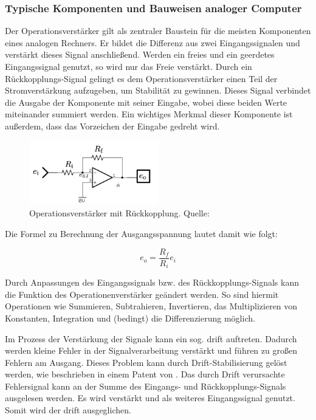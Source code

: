\subsubsection{Typische Komponenten und Bauweisen analoger Computer}

Der Operationsverstärker gilt als zentraler Baustein für die meisten Komponenten eines analogen Rechners. Er bildet die Differenz aus zwei Eingangssignalen und verstärkt dieses Signal anschließend. Werden ein freies und ein geerdetes Eingangssignal genutzt, so wird nur das Freie verstärkt. Durch ein Rückkopplungs-Signal gelingt es dem Operationsverstärker einen Teil der Stromverstärkung aufzugeben, um Stabilität zu gewinnen. Dieses Signal verbindet die Ausgabe der Komponente mit seiner Eingabe, wobei diese beiden Werte miteinander summiert werden. Ein wichtiges Merkmal dieser Komponente ist außerdem, dass das Vorzeichen der Eingabe gedreht wird. \cite[vgl. S. 73 f.]{Ulmann2022}

\begin{figure}[h]
  \includegraphics[width=0.5\textwidth]{abbildungen/opamp_mit_rueckkopplung.png}
  \caption{Operationsverstärker mit Rückkopplung. Quelle: \cite[S. 76]{Ulmann2022}}
  \label{fig:Operationsverstärker mit Rückkopplung}
\end{figure}

Die Formel zu Berechnung der Ausgangsspannung lautet damit wie folgt:

\[e_o=\frac{R_f}{R_i}e_i\]

Durch Anpassungen des Eingangssignals bzw. des Rückkopplungs-Signals kann die Funktion des Operationenverstärker geändert werden. So sind hiermit Operationen wie Summieren, Subtrahieren, Invertieren, das Multiplizieren von Konstanten, Integration und (bedingt) die Differenzierung möglich.

Im Prozess der Verstärkung der Signale kann ein sog. \gls{drift} auftreten. Dadurch werden kleine Fehler in der Signalverarbeitung verstärkt und führen zu großen Fehlern am Ausgang. Dieses Problem kann durch Drift-Stabilisierung gelöst werden, wie beschrieben in einem Patent von \cite{Goldberg1954}. Das durch Drift verursachte Fehlersignal kann an der Summe des Eingangs- und Rückkopplungs-Signals ausgelesen werden. Es wird verstärkt und als weiteres Eingangssignal genutzt. Somit wird der \gls{drift} ausgeglichen. \cite[vgl. S. 80]{Ulmann2022}

